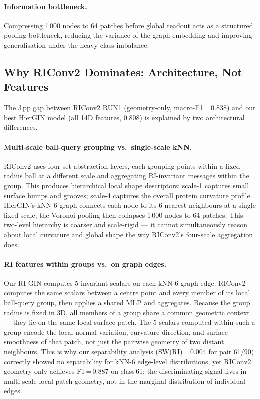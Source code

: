 \paragraph{Information bottleneck.}
Compressing 1\,000 nodes to 64 patches before global readout acts as a
structured pooling bottleneck, reducing the variance of the graph embedding
and improving generalisation under the heavy class imbalance.

\subsection{Why RIConv2 Dominates: Architecture, Not Features}
\label{sec:discussion:riconv2}

The 3\,pp gap between RIConv2 RUN1 (geometry-only, macro-F1\,=\,0.838) and
our best HierGIN model (all 14D features, 0.808) is explained by two
architectural differences.

\paragraph{Multi-scale ball-query grouping vs.\ single-scale kNN.}
RIConv2 uses four set-abstraction layers, each grouping points within a fixed
radius ball at a different scale and aggregating RI-invariant messages within
the group.
This produces hierarchical local shape descriptors: scale-1 captures small
surface bumps and grooves; scale-4 captures the overall protein curvature profile.
HierGIN's kNN-6 graph connects each node to its 6 nearest neighbours at a
single fixed scale; the Voronoi pooling then collapses 1\,000 nodes to 64
patches.
This two-level hierarchy is coarser and scale-rigid --- it cannot simultaneously
reason about local curvature and global shape the way RIConv2's four-scale
aggregation does.

\paragraph{RI features within groups vs.\ on graph edges.}
Our RI-GIN computes 5 invariant scalars on each kNN-6 graph edge.
RIConv2 computes the same scalars between a centre point and every member of
its local ball-query group, then applies a shared MLP and aggregates.
Because the group radius is fixed in 3D, all members of a group share a common
geometric context --- they lie on the same local surface patch.
The 5 scalars computed within such a group encode the local normal variation,
curvature direction, and surface smoothness of that patch, not just the pairwise
geometry of two distant neighbours.
This is why our separability analysis (SW(RI)\,=\,0.004 for pair 61/90) correctly
showed no separability for kNN-6 edge-level distributions, yet RIConv2 geometry-only
achieves F1\,=\,0.887 on class\,61: the discriminating signal lives in
multi-scale local patch geometry, not in the marginal distribution of individual
edges.

